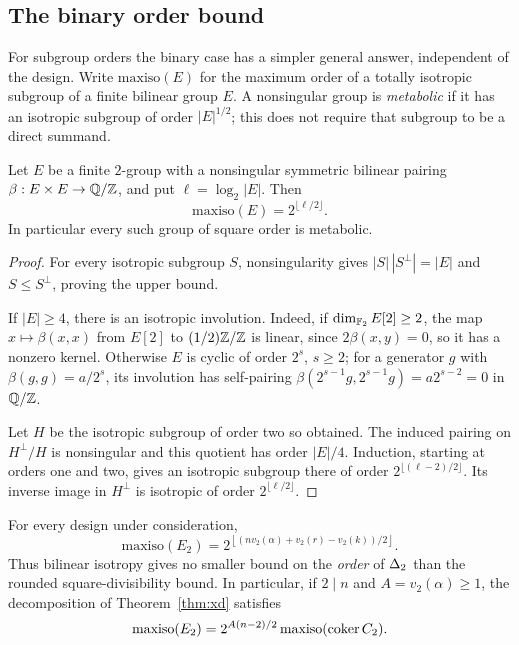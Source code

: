 \subsection{The binary order bound}

For subgroup orders the binary case has a simpler general answer, independent
of the design. Write $\mathrm{maxiso}(E)$ for the maximum order of a totally
isotropic subgroup of a finite bilinear group $E$. A nonsingular group is
\emph{metabolic} if it has an isotropic subgroup of order $|E|^{1/2}$; this
does not require that subgroup to be a direct summand.

\begin{lemma}\label{lem:plateau}
Let $E$ be a finite $2$-group with a nonsingular symmetric bilinear pairing
$\beta:E\times E\to\mathbb{Q}/\mathbb{Z}$, and put $\ell=\log_2|E|$. Then
\[
\mathrm{maxiso}(E)=2^{\lfloor\ell/2\rfloor}.
\]
In particular every such group of square order is metabolic.
\end{lemma}

\begin{proof}
For every isotropic subgroup $S$, nonsingularity gives
$|S|\,|S^\perp|=|E|$ and $S\le S^\perp$, proving the upper bound.

If $|E|\ge4$, there is an isotropic involution. Indeed, if
$\dim_{\mathbb{F}_2}E[2]\ge2$, the map $x\mapsto\beta(x,x)$ from $E[2]$ to
$(1/2)\mathbb{Z}/\mathbb{Z}$ is linear, since $2\beta(x,y)=0$, so it has a nonzero kernel.
Otherwise $E$ is cyclic of order $2^s$, $s\ge2$; for a generator $g$ with
$\beta(g,g)=a/2^s$, its involution has self-pairing
$\beta(2^{s-1}g,2^{s-1}g)=a2^{s-2}=0$ in $\mathbb{Q}/\mathbb{Z}$.

Let $H$ be the isotropic subgroup of order two so obtained.
The induced pairing on $H^\perp/H$ is nonsingular and this quotient has order
$|E|/4$. Induction, starting at orders one and two, gives an isotropic subgroup
there of order $2^{\lfloor(\ell-2)/2\rfloor}$. Its inverse image in $H^\perp$
is isotropic of order $2^{\lfloor\ell/2\rfloor}$.
\end{proof}

\begin{corollary}\label{thm:xi}
For every design under consideration,
\[
\mathrm{maxiso}(E_2)=
2^{\left\lfloor(nv_2(\alpha)+v_2(r)-v_2(k))/2\right\rfloor}.
\]
Thus bilinear isotropy gives no smaller bound on the \emph{order} of
$\Delta_2$ than the rounded square-divisibility bound. In particular, if
$2\mid n$ and $A=v_2(\alpha)\ge1$, the decomposition of
Theorem~\ref{thm:xd} satisfies
\[
\mathrm{maxiso}(E_2)=2^{A(n-2)/2}\,
\mathrm{maxiso}(\operatorname{coker} C_2).
\]
\end{corollary}

